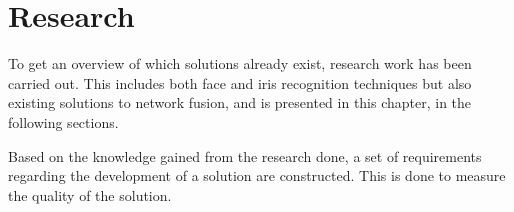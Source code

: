\chapter{Research}
\label{cha:Research}
To get an overview of which solutions already exist, research work has been carried out. This includes both face and iris recognition techniques but also existing solutions to network fusion, and is presented in this chapter, in the following sections.




Based on the knowledge gained from the research done, a set of requirements regarding the development of a solution are constructed. This is done to measure the quality of the solution.
